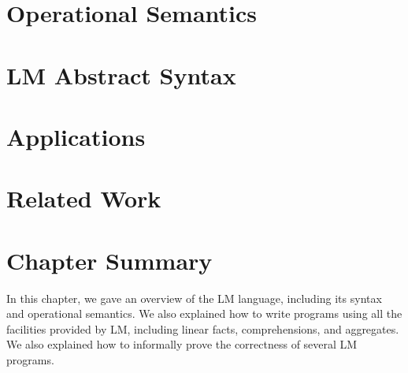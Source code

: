 \section{Operational Semantics}


\section{LM Abstract Syntax}

\section{Applications}


\section{Related Work}\label{section:language:related}

\section{Chapter Summary}

In this chapter, we gave an overview of the LM language, including its syntax
and operational semantics. We also explained how to write programs using all the
facilities provided by LM, including linear facts, comprehensions, and
aggregates. We also explained how to informally prove the correctness of several
LM programs.
